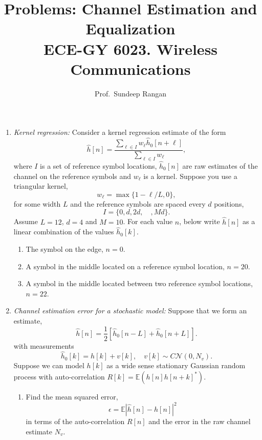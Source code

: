 \documentclass[11pt]{article}
\def\Exp{\mathbb{E}}
\begin{document}
\title{Problems:  Channel Estimation and Equalization\\
ECE-GY 6023. Wireless Communications}
\author{Prof.\ Sundeep Rangan}
\date{}

\maketitle


\begin{enumerate}

\item \emph{Kernel regression:}  
Consider a kernel regression estimate of the form
\begin{equation} \label{eq:kernel}
    \widehat{h}[n] = \frac{\sum_{\ell \in I} w_\ell \widehat{h}_0[n+\ell]}
    {\sum_{\ell \in I} w_\ell},
\end{equation}
where $I$ is a set of reference symbol locations, $\widehat{h}_0[n]$ are raw estimates of the
channel on the reference symbols and $w_\ell$ is a kernel.  
Suppose you use a triangular kernel,
\[
    w_\ell = \max\{ 1-\ell/L, 0 \},
\]
for some width $L$ and the reference symbols are spaced every $d$ positions,
\[
    I = \{0, d, 2d, \quad, Md\}.
\]
Assume $L=12$, $d=4$ and $M=10$.  For each value $n$, below write $\widehat{h}[n]$ as a linear
combination of the values $\widehat{h}_0[k]$.
\begin{enumerate}[label=(\alph*)]
\item The symbol on the edge, $n=0$.
\item A symbol in the middle located on a reference symbol location,  $n=20$.
\item A symbol in the middle located between two reference symbol locations, $n=22$.
\end{enumerate}

\item \emph{Channel estimation error for a stochastic model:}  Suppose that
we form an estimate,
\[
    \widehat{h}[n] = \frac{1}{2} \left[ \widehat{h}_0[n-L] + \widehat{h}_0[n+L] \right].
\]
with measurements
\[
    \widehat{h}_0[k] = h[k] + v[k], \quad v[k] \sim C{\mathcal N}(0,N_v).
\]
Suppose we can model $h[k]$ as a wide sense stationary Gaussian random process
with auto-correlation $R[k] = \Exp( h[n]h[n+k]^* )$.
\begin{enumerate}[label=(\alph*)]
\item Find the mean squared error,
\[
    \epsilon = \Exp | \widehat{h}[n] - h[n]|^2 
\]
in terms of the auto-correlation $R[n]$ and the error in the raw channel estimate $N_v$.


\end{enumerate}
\end{enumerate}
\end{document}
